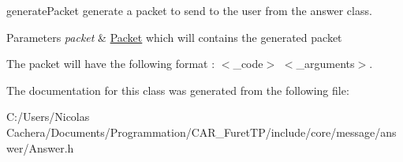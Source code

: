 generate\+Packet generate a packet to send to the user from the answer class. 


\begin{DoxyParams}{Parameters}
{\em packet} & \hyperlink{classFTP_1_1Packet}{Packet} which will contains the generated packet\\
\hline
\end{DoxyParams}
The packet will have the following format \+: $<$\+\_\+code$>$ $<$\+\_\+arguments$>$. 

The documentation for this class was generated from the following file\+:\begin{DoxyCompactItemize}
\item 
C\+:/\+Users/\+Nicolas Cachera/\+Documents/\+Programmation/\+C\+A\+R\+\_\+\+Furet\+T\+P/include/core/message/answer/Answer.\+h\end{DoxyCompactItemize}
